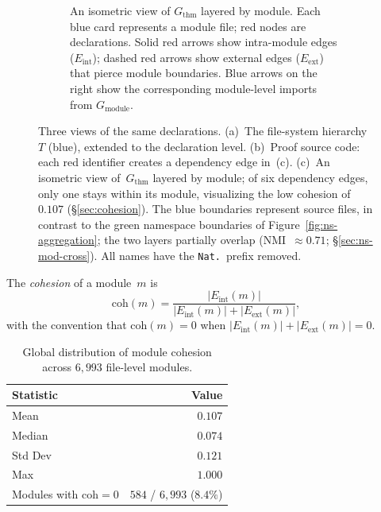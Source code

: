 \begin{figure}[H]
\begin{subfigure}[b]{\textwidth}
\begin{tikzpicture}
\end{tikzpicture}
\caption{An isometric view of $G_{\mathrm{thm}}$ layered by module. Each \textcolor{blue!60!black}{blue card} represents a module file; \textcolor{red!70!black}{red nodes} are declarations. Solid \textcolor{red!70!black}{red arrows} show intra-module edges ($E_{\mathrm{int}}$); dashed \textcolor{red!70!black}{red arrows} show external edges ($E_{\mathrm{ext}}$) that pierce module boundaries. \textcolor{blue!60!black}{Blue arrows} on the right show the corresponding module-level imports from $G_{\mathrm{module}}$.}
\label{fig:dep-view}
\end{subfigure}
\caption{Three views of the same declarations. (a)~The file-system hierarchy~$T$ (\textcolor{blue!60!black}{blue}), extended to the declaration level. (b)~Proof source code: each \textcolor{red!70!black}{red identifier} creates a dependency edge in~(c). (c)~An isometric view of~$G_{\mathrm{thm}}$ layered by module; of six dependency edges, only one stays within its module, visualizing the low cohesion of~$0.107$ (\S\ref{sec:cohesion}). The \textcolor{blue!60!black}{blue} boundaries represent source files, in contrast to the \textcolor{green!40!black}{green} namespace boundaries of Figure~\ref{fig:ns-aggregation}; the two layers partially overlap (NMI~$\approx 0.71$; \S\ref{sec:ns-mod-cross}). All names have the \texttt{Nat.}\ prefix removed.}
\label{fig:module-region}
\end{figure}

\begin{definition}
\label{def:cohesion}
The \emph{cohesion} of a module~$m$ is
\[
  \mathrm{coh}(m) = \frac{|E_{\mathrm{int}}(m)|}{|E_{\mathrm{int}}(m)| + |E_{\mathrm{ext}}(m)|},
\]
with the convention that $\mathrm{coh}(m) = 0$ when $|E_{\mathrm{int}}(m)| + |E_{\mathrm{ext}}(m)| = 0$.
\end{definition}

\begin{table}[ht]
\centering
\caption{Global distribution of module cohesion across $6{,}993$ file-level modules.}
\label{tab:cohesion-global}
\begin{tabular}{lr}
\toprule
Statistic & Value \\
\midrule
Mean       & $0.107$ \\
Median     & $0.074$ \\
Std Dev    & $0.121$ \\
Max        & $1.000$ \\
Modules with $\mathrm{coh} = 0$ & $584$ / $6{,}993$ ($8.4\%$) \\
\bottomrule
\end{tabular}
\end{table}

